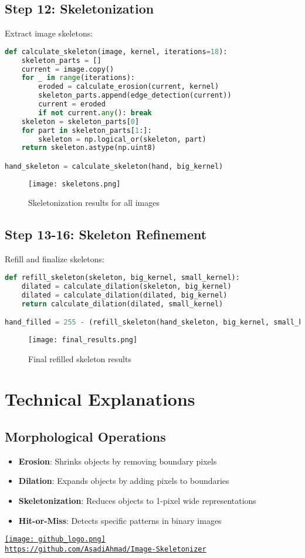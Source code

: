 \documentclass[12pt]{article}
\begin{document}
\subsection{Step 12: Skeletonization}
Extract image skeletons:
\begin{lstlisting}[language=Python]
def calculate_skeleton(image, kernel, iterations=18):
    skeleton_parts = []
    current = image.copy()
    for _ in range(iterations):
        eroded = calculate_erosion(current, kernel)
        skeleton_parts.append(edge_detection(current))
        current = eroded
        if not current.any(): break
    skeleton = skeleton_parts[0]
    for part in skeleton_parts[1:]:
        skeleton = np.logical_or(skeleton, part)
    return skeleton.astype(np.uint8)

hand_skeleton = calculate_skeleton(hand, big_kernel)
\end{lstlisting}

\begin{figure}[H]
    \centering
    \texttt{[image: skeletons.png]}
    \caption{Skeletonization results for all images}
    \label{fig:skeletons}
\end{figure}

\subsection{Step 13-16: Skeleton Refinement}
Refill and finalize skeletons:
\begin{lstlisting}[language=Python]
def refill_skeleton(skeleton, big_kernel, small_kernel):
    dilated = calculate_dilation(skeleton, big_kernel)
    dilated = calculate_dilation(dilated, big_kernel)
    return calculate_dilation(dilated, small_kernel)

hand_filled = 255 - (refill_skeleton(hand_skeleton, big_kernel, small_kernel) * 255)
\end{lstlisting}

\begin{figure}[H]
    \centering
    \texttt{[image: final\_results.png]}
    \caption{Final refilled skeleton results}
    \label{fig:final}
\end{figure}

\section{Technical Explanations}

\subsection{Morphological Operations}
\begin{itemize}
    \item \textbf{Erosion}: Shrinks objects by removing boundary pixels
    \item \textbf{Dilation}: Expands objects by adding pixels to boundaries
    \item \textbf{Skeletonization}: Reduces objects to 1-pixel wide representations
    \item \textbf{Hit-or-Miss}: Detects specific patterns in binary images
\end{itemize}

\begin{center}
    \href{https://github.com/AsadiAhmad/Image-Skeletonizer}{
        \texttt{[image: github\_logo.png]} \\
        \texttt{https://github.com/AsadiAhmad/Image-Skeletonizer}
    }
\end{center}
\end{document}
